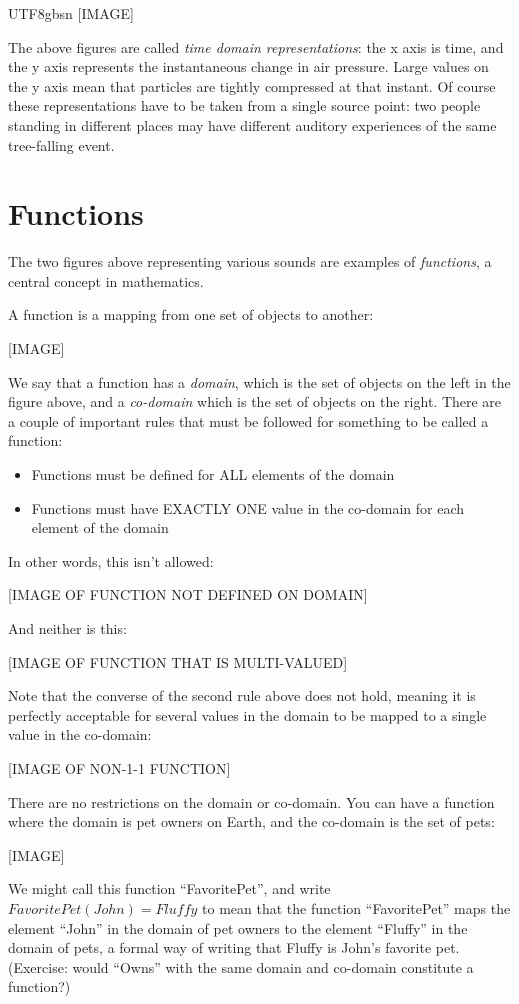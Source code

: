 \documentclass[UTF8]{book}
\begin{document}
\begin{CJK}{UTF8}{gbsn}
[IMAGE]

The above figures are called \emph{time domain representations}: the x axis is time, and the y axis represents the instantaneous change in air pressure. Large values on the y axis mean that particles are tightly compressed at that instant. Of course these representations have to be taken from a single source point: two people standing in different places may have different auditory experiences of the same tree-falling event.

\section{Functions}

The two figures above representing various sounds are examples of \emph{functions}, a central concept in mathematics.

A function is a mapping from one set of objects to another:

[IMAGE]

We say that a function has a \emph{domain}, which is the set of objects on the left in the figure above, and a \emph{co-domain} which is the set of objects on the right. There are a couple of important rules that must be followed for something to be called a function:

\begin{itemize}
\item Functions must be defined for ALL elements of the domain
\item Functions must have EXACTLY ONE value in the co-domain for each element of the domain
\end{itemize}

In other words, this isn't allowed:

[IMAGE OF FUNCTION NOT DEFINED ON DOMAIN]

And neither is this:

[IMAGE OF FUNCTION THAT IS MULTI-VALUED]

Note that the converse of the second rule above does not hold, meaning it is perfectly acceptable for several values in the domain to be mapped to a single value in the co-domain:

[IMAGE OF NON-1-1 FUNCTION]

There are no restrictions on the domain or co-domain. You can have a function where the domain is pet owners on Earth, and the co-domain is the set of pets:

[IMAGE]

We might call this function ``FavoritePet'', and write $FavoritePet(John) = Fluffy$ to mean that the function ``FavoritePet'' maps the element ``John'' in the domain of pet owners to the element ``Fluffy'' in the domain of pets, a formal way of writing that Fluffy is John's favorite pet. (Exercise: would ``Owns'' with the same domain and co-domain constitute a function?)


\end{CJK}
\end{document}
